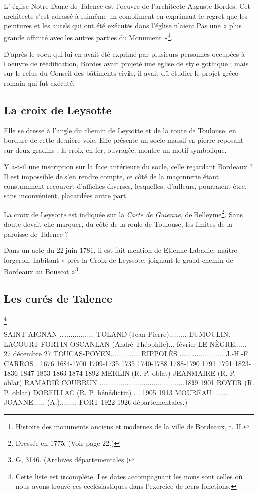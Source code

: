 L' église Notre-Dame de Talence est l'oeuvre de l'architecte Auguste Bordes. Cet architecte s'est adressé à luimême un compliment en exprimant le regret que les peintures et les autels qui ont été exécutés dans l'église n'aient Pas une « plus grande affinité avec les autres parties du Monument »\footnote{Histoire  des monuments anciens et modernes de la ville de Bordeaux, t. II.}.

D'après le voeu qui lui en avait été exprimé par plusieurs personnes occupées à l'oeuvre de réédification, Bordes avait projeté une église de style gothique ; mais sur le refus du Conseil des bâtiments civils, il avait dû étudier le projet gréco-romain qui fut exécuté.

\subsection{La croix de Leysotte}

Elle se dresse à l'angle du chemin de Leysotte et de la route de Toulouse, en bordure de cette dernière voie. Elle présente un socle massif en pierre reposant sur deux gradins ; la croix en fer, ouvragée, montre un motif symbolique.

Y a-t-il une inscription sur la face antérieure du socle, celle regardant Bordeaux ? Il est impossible de s'en rendre compte, ce côté de la maçonnerie étant constamment recouvert d'affiches diverses, lesquelles, d'ailleurs, pourraient être, sans inconvénient, placardées autre part.

La croix de Leysotte est indiquée sur la \textit{Carte de Guienne}, de Belleyme\footnote{Dressée en 1775. (Voir page 22.)}. Sans doute devait-elle marquer, du côté de la roule de Toulouse, les limites de la paroisse de Talence ?

Dans un acte du 22 juin 1781, il est fait mention de Etienne Labadie, maître forgeron, habitant « près la Croix de Leyssote, joignant le grand chemin de Bordeaux au Bouscot »\footnote{G, 3146. (Archives départementales.)}.


\subsection{Les curés de Talence}\footnote{Cette liste est incomplète. Les dates accompagnant les noms sont celles où nous avons trouvé ces ecclésiastiques dans l'exercice de leurs fonctions.}

SAINT-AIGNAN .................. TOLAND (Jean-Pierre)......... DUMOULIN. LACOURT FORTIN OSCANLAN (André-Théophile)... février LE NÈGRE...... 27 décembre 27 TOUCAS-POYEN............... RIPPOLÈS ....................... J.-H.-F. CARROS . 1676 1684-1700 1709-1735 1735 1740-1788 1788-1790 1791 1791 1823-1836 1847 1853-1863 1874 1892 MERLIN (R. P. oblat) JEANMAIRE (R. P. oblat) RAMADIÉ COUBRUN ............................................1899 1901 ROYER (R. P. oblat) DOREILLAC (R. P. bénédictin) . . 1905 1913 MOUREAU ....... JOANNE...... (A.)......... FORT 1922 1926 départementales.)  